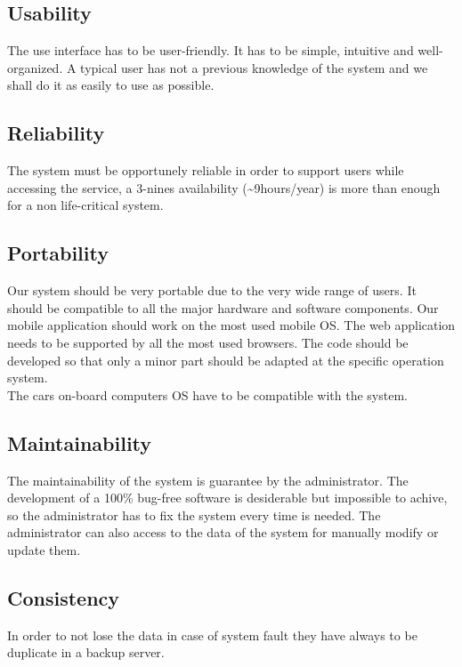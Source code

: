 \subsection{Usability}
\label{sec:usability}
 The use interface has to be user-friendly. It has to be simple, intuitive and well-organized. A typical user has not a previous knowledge of the system and we shall do it as easily to use as possible.

\subsection{Reliability}
The system must be opportunely reliable in order to support users while accessing the service, a 3-nines availability (\textasciitilde9hours/year) is more than enough for a non life-critical system.

\subsection{Portability}
Our system should be very portable due to the very wide range of users. It should be compatible to all the major hardware and software components. Our mobile application should work on the most used mobile OS. The web application needs to be supported by all the most used browsers. The code should be developed so that only a minor part should be adapted at the specific operation system.
\\The cars on-board computers OS have to be compatible with the system. %

\subsection{Maintainability}
The maintainability of the system is guarantee by the administrator. The development of a 100\% bug-free software is desiderable but impossible to achive, so the administrator has to fix the system every time is needed. The administrator can also access to the data of the system for manually modify or update them.

\subsection{Consistency}
In order to not lose the data in case of system fault they have always to be duplicate in a backup server.  

